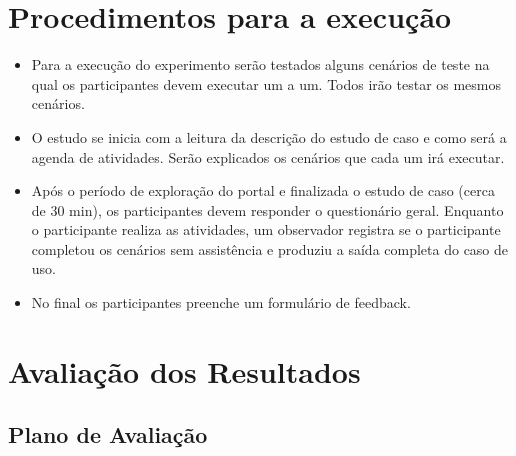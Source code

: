 \begin{table}[h]
\begin{tabular}{|l|l|l|l|}
\end{tabular}
\end{table}

\section{Procedimentos para a execução}

\begin{itemize}

\item Para a execução do experimento serão testados alguns cenários de teste na qual os participantes devem executar um a um. Todos irão testar os mesmos cenários.
\item O estudo se inicia com a leitura da descrição do estudo de caso e como será a agenda de atividades. Serão explicados os cenários que cada um irá executar.
\item Após o período de exploração do portal e finalizada o estudo de caso (cerca de 30 min), os participantes devem responder o questionário geral.
Enquanto o participante realiza as atividades, um observador registra se o participante completou os cenários sem assistência e produziu a saída completa do caso de uso.
\item No final os participantes preenche um formulário de feedback.

\end{itemize}

\section{Avaliação dos Resultados}

\subsection{Plano de Avaliação}

